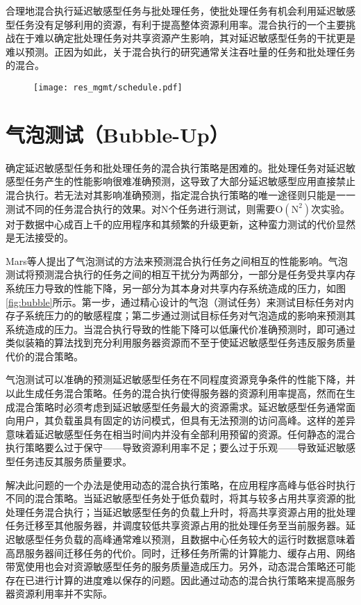 合理地混合执行延迟敏感型任务与批处理任务，使批处理任务有机会利用延迟敏感型任务没有足够利用的资源，有利于提高整体资源利用率。混合执行的一个主要挑战在于难以确定批处理任务对共享资源产生影响，其对延迟敏感型任务的干扰更是难以预测。正因为如此，关于混合执行的研究通常关注吞吐量的任务和批处理任务的混合\cite{cook2013hardware}\cite{nathuji2010q}。

\begin{figure}
  \centering
  \texttt{[image: res\_mgmt/schedule.pdf]}
  \label{fig:schedule}
\end{figure}

\section{气泡测试（Bubble-Up）}
确定延迟敏感型任务和批处理任务的混合执行策略是困难的。批处理任务对延迟敏感型任务产生的性能影响很难准确预测，这导致了大部分延迟敏感型应用直接禁止混合执行。若无法对其影响准确预测，指定混合执行策略的唯一途径则只能是一一测试不同的任务混合执行的效果。对$\mathrm{N}$个任务进行测试，则需要$\mathrm{O(N^2)}$次实验。对于数据中心成百上千的应用程序和其频繁的升级更新，这种蛮力测试的代价显然是无法接受的。

Mars等人提出了气泡测试的方法来预测混合执行任务之间相互的性能影响\cite{mars2012increasing}。气泡测试将预测混合执行的任务之间的相互干扰分为两部分，一部分是任务受共享内存系统压力导致的性能下降，另一部分为其本身对共享内存系统造成的压力，如图\ref{fig:bubble}所示\cite{mars2012increasing}。第一步，通过精心设计的气泡（测试任务）来测试目标任务对内存子系统压力的的敏感程度；第二步通过测试目标任务对气泡造成的影响来预测其系统造成的压力。当混合执行导致的性能下降可以低廉代价准确预测时，即可通过类似装箱的算法找到充分利用服务器资源而不至于使延迟敏感型任务违反服务质量代价的混合策略。


气泡测试可以准确的预测延迟敏感型任务在不同程度资源竞争条件的性能下降，并以此生成任务混合策略。任务的混合执行使得服务器的资源利用率提高，然而在生成混合策略时必须考虑到延迟敏感型任务最大的资源需求。延迟敏感型任务通常面向用户，其负载虽具有固定的访问模式，但具有无法预测的访问高峰。这样的差异意味着延迟敏感型任务在相当时间内并没有全部利用预留的资源。任何静态的混合执行策略要么过于保守——导致资源利用率不足；要么过于乐观——导致延迟敏感型任务违反其服务质量要求\cite{lo2015heracles}。

解决此问题的一个办法是使用动态的混合执行策略，在应用程序高峰与低谷时执行不同的混合策略。当延迟敏感型任务处于低负载时，将其与较多占用共享资源的批处理任务混合执行；当延迟敏感型任务的负载上升时，将高共享资源占用的批处理任务迁移至其他服务器，并调度较低共享资源占用的批处理任务至当前服务器。延迟敏感型任务负载的高峰通常难以预测，且数据中心任务较大的运行时数据意味着高昂服务器间迁移任务的代价。同时，迁移任务所需的计算能力、缓存占用、网络带宽使用也会对资源敏感型任务的服务质量造成压力。另外，动态混合策略还可能存在已进行计算的进度难以保存的问题。因此通过动态的混合执行策略来提高服务器资源利用率并不实际。

